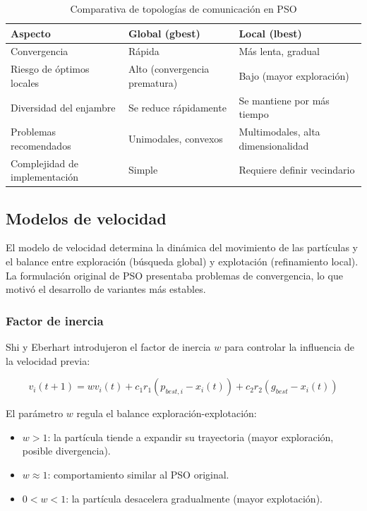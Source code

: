 \documentclass[12pt]{article}
\begin{document}
\begin{table}[H]
  \centering
  \caption{Comparativa de topologías de comunicación en PSO}
  \label{tab:topologias-pso}
  \begin{tabularx}{\textwidth}{lXX}
    \toprule
    \textbf{Aspecto} & \textbf{Global (gbest)} & \textbf{Local (lbest)} \\
    \midrule
    Convergencia &
    Rápida &
    Más lenta, gradual \\
    \addlinespace
    Riesgo de óptimos locales &
    Alto (convergencia prematura) &
    Bajo (mayor exploración) \\
    \addlinespace
    Diversidad del enjambre &
    Se reduce rápidamente &
    Se mantiene por más tiempo \\
    \addlinespace
    Problemas recomendados &
    Unimodales, convexos &
    Multimodales, alta dimensionalidad \\
    \addlinespace
    Complejidad de implementación &
    Simple &
    Requiere definir vecindario \\
    \bottomrule
  \end{tabularx}
\end{table}

\subsection{Modelos de velocidad}

El modelo de velocidad determina la dinámica del movimiento de las
partículas y el balance entre exploración (búsqueda global) y
explotación (refinamiento local). La formulación original de PSO
presentaba problemas de convergencia, lo que motivó el desarrollo de
variantes más estables.

\subsubsection{Factor de inercia}

Shi y Eberhart introdujeron el factor de inercia $w$ para controlar
la influencia de la velocidad previa:

\begin{equation}
  v_i(t+1) = w v_i(t) + c_1 r_1 (p_{best,i} - x_i(t)) + c_2 r_2
  (g_{best} - x_i(t))
\end{equation}

El parámetro $w$ regula el balance exploración-explotación:
\begin{itemize}
  \item $w > 1$: la partícula tiende a expandir su trayectoria
    (mayor exploración, posible divergencia).
  \item $w \approx 1$: comportamiento similar al PSO original.
  \item $0 < w < 1$: la partícula desacelera gradualmente
    (mayor explotación).
\end{itemize}
\end{document}
